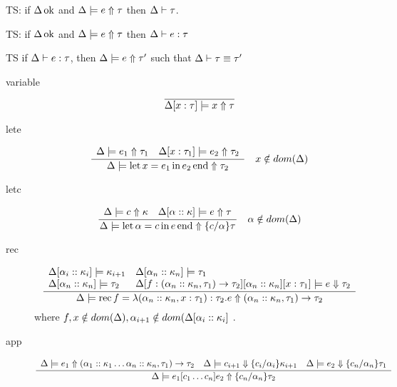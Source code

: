 \documentclass[12pt,twoside,fleqn]{amsart}
\theoremstyle{plain}
\theoremstyle{plain}
\theoremstyle{definition}
\begin{document}
TS: if \( \Delta  \, \mathrm{ok} \) and \( \Delta  \models e  \Uparrow \tau   \) then \( \Delta  \vdash \tau   \).

TS: if \( \Delta  \, \mathrm{ok} \) and \( \Delta  \models e  \Uparrow \tau   \) then \( \Delta  \vdash e  :\tau   \)

TS if \( \Delta  \vdash e  :\tau   \), then \( \Delta  \models e  \Uparrow \tau '  \) such that \( \Delta  \vdash \tau  \equiv \tau ' \)

\begin{description}
\item [variable]
\[
\overline{\Delta  [x  :\tau   ] \models x \Uparrow \tau  }\]

\item [lete]
\[
\frac{\begin{array}{ll}
\Delta  \models e_{1}  \Uparrow \tau _{1}  & \Delta  [x  :\tau _{1}  ] \models e_{2} \Uparrow \tau _{2}
\end{array}}{\Delta  \models \mathrm{let}\, x =e_{1} \, \mathrm{in}\, e_{2} \, \mathrm{end}  \Uparrow \tau _{2} }\quad x\notin dom(\Delta )\]

\item [letc]
\[
\frac{\begin{array}{ll}
\Delta  \models c \Uparrow \kappa  & \Delta  [\alpha   ::\kappa   ] \models e \Uparrow \tau 
\end{array}}{\Delta  \models \mathrm{let}\, \alpha  =c \, \mathrm{in}\, e \, \mathrm{end}  \Uparrow \{c /\alpha  \}\tau  }\quad \alpha \notin dom(\Delta )\]

\item [rec]
\[
\frac{\begin{array}{ll}
\Delta  [\alpha _{i}  ::\kappa _{i}  ] \models \kappa _{i+1} & \Delta  [\alpha _{n}  ::\kappa _{n}  ] \models \tau _{1}\\
\Delta  [\alpha _{n}  ::\kappa _{n}  ] \models \tau _{2} & \Delta [f :(\alpha _{n}::\kappa _{n},\tau _{1})\rightarrow \tau _{2} ][\alpha _{n} ::\kappa _{n} ][x :\tau _{1} ] \models e \Downarrow \tau _{2}
\end{array} }{\Delta  \models \mathrm{rec}\, f =\lambda (\alpha _{n} ::\kappa _{n} ,x :\tau _{1} ):\tau _{2} .e  \Uparrow (\alpha _{n}::\kappa _{n},\tau _{1})\rightarrow \tau _{2}  }\]
  where \( f,x\notin dom(\Delta ),\alpha _{i+1}\notin dom(\Delta  [\alpha _{i}  ::\kappa _{i}  ] \)
.
\item [app]
\[
\frac{\begin{array}{lll}
\Delta  \models e_{1}  \Uparrow (\alpha _{1}::\kappa _{1}\ldots \alpha _{n}::\kappa _{n},\tau _{1})\rightarrow \tau _{2}  & \Delta  \models c_{i+1} \Downarrow \{c_{i} /\alpha _{i} \}\kappa _{i+1} & \Delta  \models e_{2} \Downarrow \{c_{n} /\alpha _{n} \}\tau _{1}
\end{array} }{\Delta  \models e_{1}[c_{1}\ldots c_{n}]e_{2}  \Uparrow \{c_{n} /\alpha _{n} \}\tau _{2}  }\]


\end{description}
\end{document}
